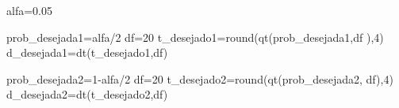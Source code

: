 \documentclass[
]{book}
\newenvironment{Shaded}{\begin{snugshade}}{\end{snugshade}}
\newcommand{\DecValTok}[1]{\textcolor[rgb]{0.00,0.00,0.81}{#1}}
\newcommand{\FloatTok}[1]{\textcolor[rgb]{0.00,0.00,0.81}{#1}}
\newcommand{\FunctionTok}[1]{\textcolor[rgb]{0.00,0.00,0.00}{#1}}
\newcommand{\NormalTok}[1]{#1}
\newcommand{\OtherTok}[1]{\textcolor[rgb]{0.56,0.35,0.01}{#1}}
\newcommand{\SpecialCharTok}[1]{\textcolor[rgb]{0.00,0.00,0.00}{#1}}
\begin{document}
\begin{Shaded}
\begin{Highlighting}[]
\NormalTok{alfa}\OtherTok{=}\FloatTok{0.05}

\NormalTok{prob\_desejada1}\OtherTok{=}\NormalTok{alfa}\SpecialCharTok{/}\DecValTok{2}
\NormalTok{df}\OtherTok{=}\DecValTok{20}
\NormalTok{t\_desejado1}\OtherTok{=}\FunctionTok{round}\NormalTok{(}\FunctionTok{qt}\NormalTok{(prob\_desejada1,df ),}\DecValTok{4}\NormalTok{)}
\NormalTok{d\_desejada1}\OtherTok{=}\FunctionTok{dt}\NormalTok{(t\_desejado1,df)}

\NormalTok{prob\_desejada2}\OtherTok{=}\DecValTok{1}\SpecialCharTok{{-}}\NormalTok{alfa}\SpecialCharTok{/}\DecValTok{2}
\NormalTok{df}\OtherTok{=}\DecValTok{20}
\NormalTok{t\_desejado2}\OtherTok{=}\FunctionTok{round}\NormalTok{(}\FunctionTok{qt}\NormalTok{(prob\_desejada2, df),}\DecValTok{4}\NormalTok{)}
\NormalTok{d\_desejada2}\OtherTok{=}\FunctionTok{dt}\NormalTok{(t\_desejado2,df)}




\end{Highlighting}
\end{Shaded}
\end{document}
